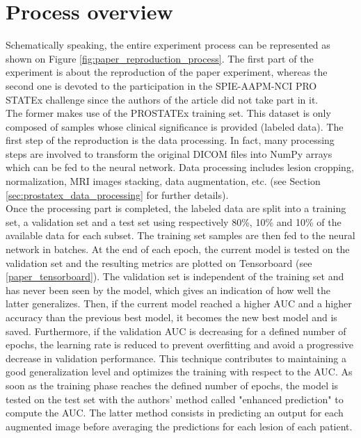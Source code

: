 \section{Process overview}
\setlength{\marginparwidth}{3cm}\leavevmode {}Schematically speaking, the entire experiment process can be represented as shown on Figure \ref{fig:paper_reproduction_process}. The first part of the experiment is about the reproduction of the paper experiment, whereas the second one is devoted to the participation in the SPIE-AAPM-NCI PRO\- STATEx challenge since the authors of the article did not take part in it.\\
The former makes use of the PROSTATEx training set. This dataset is only composed of samples whose clinical significance is provided (labeled data). The first step of the reproduction is the data processing. In fact, many processing steps are involved to transform the original DICOM files into NumPy arrays which can be fed to the neural network. Data processing includes lesion cropping, normalization, MRI images stacking, data augmentation, etc. (see Section \ref{sec:prostatex_data_processing} for further details).\\
Once the processing part is completed, the labeled data are split into a training set, a validation set and a test set using respectively 80\%, 10\% and 10\% of the available data for each subset. The training set samples are then fed to the neural network in batches. 
At the end of each epoch, the current model is tested on the validation set and the resulting metrics are plotted on Tensorboard (see \ref{paper_tensorboard}). The validation set is independent of the training set and has never been seen by the model, which gives an indication of how well the latter generalizes. Then, if the current model reached a higher AUC and a higher accuracy than the previous best model, it becomes the new best model and is saved. Furthermore, if the validation AUC is decreasing for a defined number of epochs, the learning rate is reduced to prevent overfitting and avoid a  progressive decrease in validation performance. This technique contributes to maintaining a good generalization level and optimizes the training with respect to the AUC. As soon as the training phase reaches the defined number of epochs, the model is tested on the test set with the authors' method called "enhanced prediction" to compute the AUC. The latter method consists in predicting an output for each augmented image before averaging the predictions for each lesion of each patient.

